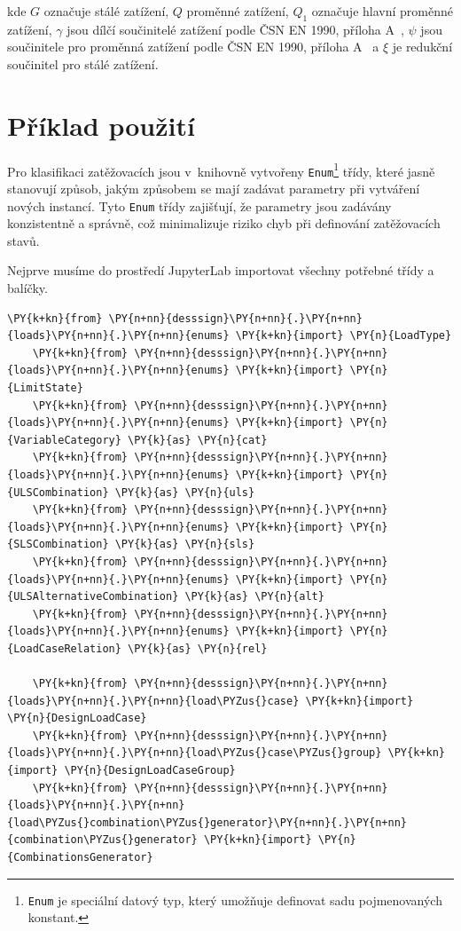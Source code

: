 kde $G$ označuje stálé zatížení, $Q$ proměnné zatížení, $Q_{1}$ označuje hlavní proměnné zatížení, $\gamma$ jsou dílčí součinitelé zatížení podle ČSN EN 1990, příloha A~\cite{EN1990}, $\psi$ jsou součinitele pro proměnná zatížení podle ČSN EN 1990, příloha A~\cite{EN1990} a $\xi$ je redukční součinitel pro stálé zatížení.

\section{Příklad použití}

Pro klasifikaci zatěžovacích jsou v~knihovně vytvořeny \texttt{Enum}\footnote{\texttt{Enum} je speciální datový typ, který umožňuje definovat sadu pojmenovaných konstant.} třídy, které jasně stanovují způsob, jakým způsobem se mají zadávat parametry při vytváření nových instancí. Tyto \texttt{Enum} třídy zajišťují, že parametry jsou zadávány konzistentně a správně, což minimalizuje riziko chyb při definování zatěžovacích stavů.

Nejprve musíme do prostředí JupyterLab importovat všechny potřebné třídy a balíčky.
\begin{tcolorbox}[breakable, size=fbox, boxrule=1pt, pad at break*=1mm,colback=cellbackground, colframe=cellborder]
    \begin{Verbatim}[commandchars=\\\{\}]
    \PY{k+kn}{from} \PY{n+nn}{desssign}\PY{n+nn}{.}\PY{n+nn}{loads}\PY{n+nn}{.}\PY{n+nn}{enums} \PY{k+kn}{import} \PY{n}{LoadType}
    \PY{k+kn}{from} \PY{n+nn}{desssign}\PY{n+nn}{.}\PY{n+nn}{loads}\PY{n+nn}{.}\PY{n+nn}{enums} \PY{k+kn}{import} \PY{n}{LimitState}
    \PY{k+kn}{from} \PY{n+nn}{desssign}\PY{n+nn}{.}\PY{n+nn}{loads}\PY{n+nn}{.}\PY{n+nn}{enums} \PY{k+kn}{import} \PY{n}{VariableCategory} \PY{k}{as} \PY{n}{cat}
    \PY{k+kn}{from} \PY{n+nn}{desssign}\PY{n+nn}{.}\PY{n+nn}{loads}\PY{n+nn}{.}\PY{n+nn}{enums} \PY{k+kn}{import} \PY{n}{ULSCombination} \PY{k}{as} \PY{n}{uls}
    \PY{k+kn}{from} \PY{n+nn}{desssign}\PY{n+nn}{.}\PY{n+nn}{loads}\PY{n+nn}{.}\PY{n+nn}{enums} \PY{k+kn}{import} \PY{n}{SLSCombination} \PY{k}{as} \PY{n}{sls}
    \PY{k+kn}{from} \PY{n+nn}{desssign}\PY{n+nn}{.}\PY{n+nn}{loads}\PY{n+nn}{.}\PY{n+nn}{enums} \PY{k+kn}{import} \PY{n}{ULSAlternativeCombination} \PY{k}{as} \PY{n}{alt}
    \PY{k+kn}{from} \PY{n+nn}{desssign}\PY{n+nn}{.}\PY{n+nn}{loads}\PY{n+nn}{.}\PY{n+nn}{enums} \PY{k+kn}{import} \PY{n}{LoadCaseRelation} \PY{k}{as} \PY{n}{rel}
    
    \PY{k+kn}{from} \PY{n+nn}{desssign}\PY{n+nn}{.}\PY{n+nn}{loads}\PY{n+nn}{.}\PY{n+nn}{load\PYZus{}case} \PY{k+kn}{import} \PY{n}{DesignLoadCase}
    \PY{k+kn}{from} \PY{n+nn}{desssign}\PY{n+nn}{.}\PY{n+nn}{loads}\PY{n+nn}{.}\PY{n+nn}{load\PYZus{}case\PYZus{}group} \PY{k+kn}{import} \PY{n}{DesignLoadCaseGroup}
    \PY{k+kn}{from} \PY{n+nn}{desssign}\PY{n+nn}{.}\PY{n+nn}{loads}\PY{n+nn}{.}\PY{n+nn}{load\PYZus{}combination\PYZus{}generator}\PY{n+nn}{.}\PY{n+nn}{combination\PYZus{}generator} \PY{k+kn}{import} \PY{n}{CombinationsGenerator}
    \end{Verbatim}
    \end{tcolorbox}

